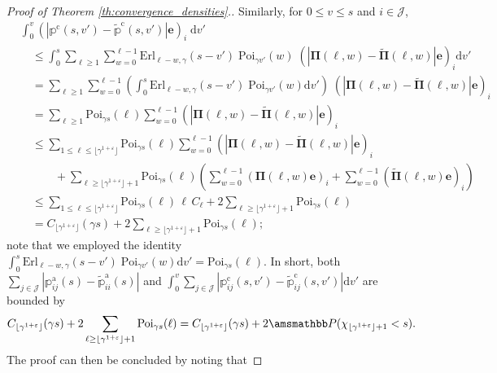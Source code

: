 \documentclass[11pt,leqno]{amsart}
\numberwithin{table}{section}
\numberwithin{figure}{section}
\numberwithin{equation}{section}
\newcommand{\dd}{\mathrm{d}}
\newcommand{\1}{{\mathds{1}}}
\newcommand{\0}{\mat{0}}
\renewcommand{\P }{{\amsmathbb P}}
\newcommand{\ap}[1]{\mathbb{#1}}
\newcommand{\tld}[1]{\widetilde{#1}}
\newcommand{\apt}[1]{\tld{\mathbb{#1}}}
\begin{document}
{\begin{proof}[Proof of Theorem \ref{th:convergence_densities}.]
{}
{
Similarly, for $0\le v\le s$ and $i\in\mathcal{J}$,
\begin{align*}
&\int_0^v \left(\left| \ap{p}^{\mathrm{c}}(s,v') - \apt{p}^{\mathrm{c}}(s,v')\right| \bm{e}\right)_i\;\dd v' \\
&\quad \le \int_0^s \sum_{\ell\ge 1}\sum_{w=0}^{\ell-1}\mathrm{Erl}_{\ell-w,\gamma}(s-v') \; \mathrm{Poi}_{\gamma v'} (w)\; \left(\left|\bm{\Pi}(\ell, w)-\tld{\bm{\Pi}}(\ell, w)\right|\bm{e}\right)_i\dd v'\\
&\quad =\sum_{\ell\ge 1}\sum_{w=0}^{\ell-1}\left(\int_0^s \mathrm{Erl}_{\ell-w,\gamma}(s-v') \; \mathrm{Poi}_{\gamma v'} (w) \dd v'\right)\; \left(\left|\bm{\Pi}(\ell, w)-\tld{\bm{\Pi}}(\ell, w)\right|\bm{e}\right)_i\\
&\quad =\sum_{\ell\ge 1} \mathrm{Poi}_{\gamma s} (\ell) \sum_{w=0}^{\ell-1} \left(\left|\bm{\Pi}(\ell, w)-\tld{\bm{\Pi}}(\ell, w)\right|\bm{e}\right)_i\\
&\quad \le \sum_{1\le \ell \le \lfloor \gamma^{1+\varepsilon} \rfloor} \mathrm{Poi}_{\gamma s} (\ell) \sum_{w=0}^{\ell-1} \left(\left|\bm{\Pi}(\ell, w)-\tld{\bm{\Pi}}(\ell, w)\right|\bm{e}\right)_i\\
&\qquad\quad + \sum_{\ell\ge \lfloor \gamma^{1+\varepsilon} \rfloor +1 }\mathrm{Poi}_{\gamma s} (\ell)\left(\sum_{w=0}^{\ell-1} (\bm{\Pi}(\ell, w)\bm{e})_i+ \sum_{w=0}^{\ell-1} (\tld{\bm{\Pi}}(\ell, w)\bm{e})_i\right)\\
&\quad \le\sum_{1\le \ell \le \lfloor \gamma^{1+\varepsilon} \rfloor} \mathrm{Poi}_{\gamma s} (\ell) \,\ell\, C_\ell + 2 \sum_{\ell\ge \lfloor \gamma^{1+\varepsilon} \rfloor +1 }\mathrm{Poi}_{\gamma s} (\ell)\\
&\quad = C_{\lfloor \gamma^{1+\varepsilon} \rfloor}(\gamma s) + 2 \sum_{\ell\ge \lfloor \gamma^{1+\varepsilon} \rfloor +1 }\mathrm{Poi}_{\gamma s} (\ell);
\end{align*}
}
note that we employed the identity $\int_0^s \mathrm{Erl}_{\ell-w,\gamma}(s-v') \; \mathrm{Poi}_{\gamma v'} (w) \dd v'=\mathrm{Poi}_{\gamma s}(\ell)$. In short, both { $\sum_{j\in\mathcal{J}}\left|\ap{p}_{ij}^{\mathrm{a}}(s) - \apt{p}_{ii}^{\mathrm{a}}( s)\right|$ and $\int_0^v \sum_{j\in\mathcal{J}}\left| \ap{p}_{ij}^{\mathrm{c}}(s,v') - \apt{p}_{ij}^{\mathrm{c}}(s,v')\right| \dd v'$} are bounded by 
\[C_{\lfloor \gamma^{1+\varepsilon} \rfloor}(\gamma s) + 2 \sum_{\ell\ge \lfloor \gamma^{1+\varepsilon} \rfloor +1 }\mathrm{Poi}_{\gamma s} (\ell)= C_{\lfloor \gamma^{1+\varepsilon} \rfloor}(\gamma s) + 2 \P(\chi_{\lfloor \gamma^{1+\varepsilon} \rfloor +1}<s).\]
The proof can then be concluded by noting that

\end{proof}}
\end{document}
